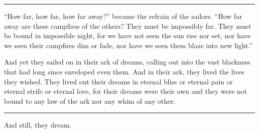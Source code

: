 \begin{center}\rule{0.5\linewidth}{0.5pt}\end{center}

``How far, how far, how far away?'' became the refrain of the sailors. ``How far away are these campfires of the others? They must be impossibly far. They must be bound in impossible night, for we have not seen the sun rise nor set, nor have we seen their campfires dim or fade, nor have we seen them blaze into new light.''

And yet they sailed on in their ark of dreams, calling out into the vast blackness that had long since enveloped even them. And in their ark, they lived the lives they wished. They lived out their dreams in eternal bliss or eternal pain or eternal strife or eternal love, for their dreams were their own and they were not bound to any law of the ark nor any whim of any other.

\begin{center}\rule{0.5\linewidth}{0.5pt}\end{center}

And still, they dream.
